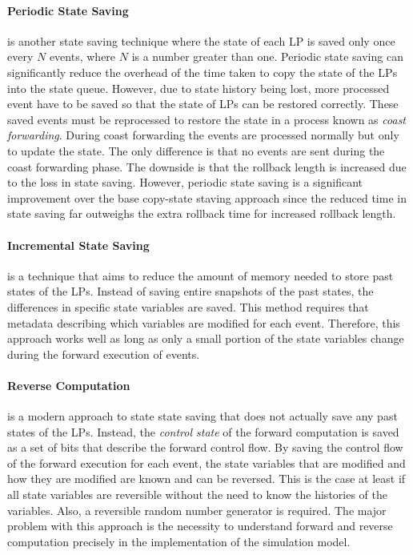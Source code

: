 \documentclass[11pt]{book}
\begin{document}
\paragraph{Periodic State Saving} is another state saving technique where the state of each LP
is saved only once every $N$ events, where $N$ is a number greater than one. Periodic state
saving can significantly reduce the overhead of the time taken to copy the state of the
LPs into the state queue. However, due to state history being lost, more processed event
have to be saved so that the state of LPs can be restored correctly. These saved events
must be reprocessed to restore the state in a process known as \emph{coast forwarding}.
During coast forwarding the events are processed normally but only to update the state.
The only difference is that no events are sent during the coast forwarding phase. The
downside is that the rollback length is increased due to the loss in state saving. However,
periodic state saving is a significant improvement over the base copy-state staving approach
since the reduced time in state saving far outweighs the extra rollback time for increased
rollback length.

\paragraph{Incremental State Saving} is a technique that aims to reduce the amount of
memory needed to store past states of the LPs. Instead of saving entire snapshots of the
past states, the differences in specific state variables are saved. This method requires
that metadata describing which variables are modified for each event. Therefore, this approach
works well as long as only a small portion of the state variables change during the forward
execution of events.

\paragraph{Reverse Computation} is a modern approach to state state saving that does not
actually save any past states of the LPs. Instead, the \emph{control state} of the forward
computation is saved as a set of bits that describe the forward control flow. By saving the control
flow of the forward execution for each event, the state variables that are modified and
how they are modified are known and can be reversed. This is the case at least if all state variables
are reversible without the need to know the histories of the variables. Also, a reversible
random number generator is required. The major problem with this approach is the necessity to
understand forward and reverse computation precisely in the implementation of the simulation model.
\end{document}
